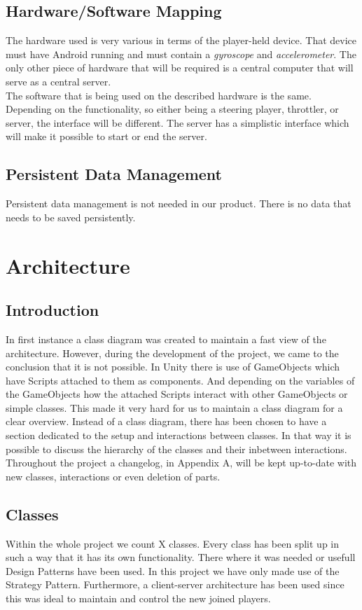 \documentclass[11pt,twoside,a4paper]{article}
\begin{document}
\subsection{Hardware/Software Mapping}
The hardware used is very various in terms of the player-held device. That device must have Android running and must contain a \emph{gyroscope} and \emph{accelerometer}. The only other piece of hardware that will be required is a central computer that will serve as a central server. \\
The software that is being used on the described hardware is the same. Depending on the functionality, so either being a steering player, throttler, or server, the interface will be different. The server has a simplistic interface which will make it possible to start or end the server.


\subsection{Persistent Data Management}
Persistent data management is not needed in our product. There is no data that needs to be saved persistently.

\newpage

\section{Architecture}
\subsection{Introduction}
In first instance a class diagram was created to maintain a fast view of the architecture. However, during the development of the project, we came to the conclusion that it is not possible. In Unity there is use of GameObjects which have Scripts attached to them as components. And depending on the variables of the GameObjects how the attached Scripts interact with other GameObjects or simple classes. This made it very hard for us to maintain a class diagram for a clear overview. 
Instead of a class diagram, there has been chosen to have a section dedicated to the setup and interactions between classes. In that way it is possible to discuss the hierarchy of the classes and their inbetween interactions. Throughout the project a changelog, in Appendix A, will be kept up-to-date with new classes, interactions or even deletion of parts.

\subsection{Classes}
Within the whole project we count X classes. Every class has been split up in such a way that it has its own functionality. There where it was needed or usefull Design Patterns have been used. In this project we have only made use of the Strategy Pattern. Furthermore, a client-server architecture has been used since this was ideal to maintain and control the new joined players.
\end{document}
